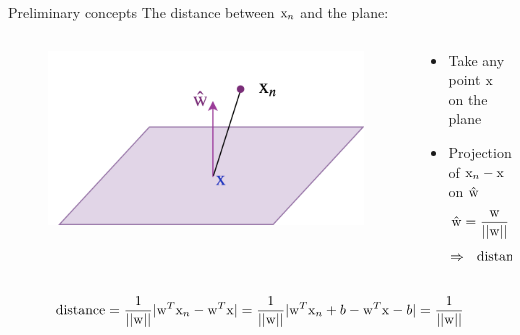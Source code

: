 \begin{frame}{Preliminary concepts}
The distance between ${\rm x}_n$ and the plane:
\begin{columns}
\begin{column}{4cm}
\begin{figure}
\includegraphics[scale=0.6]{Figures/SVM02.png}
\end{figure}
\end{column}
\begin{column}{6cm}
\begin{itemize}
\item Take any point ${\rm x}$ on the plane
\item Projection of ${\rm x}_n-{\rm x}$ on $\hat{\rm w}$
\[\hat{\rm w}=\frac{\rm w}{||\rm w||}\]
\[\Rightarrow ~~\text{distance}=|\hat{\rm w}^T({\rm x}_n-{\rm x})|\]
%
\end{itemize}

\end{column}
\end{columns}
\[\text{distance} = \frac{1}{||{\rm w}||}|{\rm w}^T{\rm x}_n-{\rm w}^T{\rm x}|= \frac{1}{||{\rm w}||}|{\rm w}^T{\rm x}_n+b-{\rm w}^T{\rm x}-b|=\frac{1}{||{\rm w}||}\]
\end{frame}


